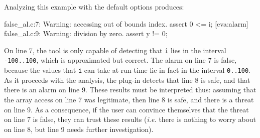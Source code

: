 \documentclass{frama-c-book}
\begin{document}
Analyzing this example with the default options produces:
\begin{logsmath}
 false_al.c:7: Warning: accessing out of bounds index. assert 0 <= i;
[eva:alarm] false_al.c:9: Warning: division by zero. assert y != 0;
\end{logsmath}

On line 7, the tool is only capable of detecting that \lstinline|i| lies in
the interval \lstinline|-100..100|, which is approximated but correct.
The alarm on line 7 is false, because the values that \lstinline|i| can
take at run-time lie in fact in the interval \lstinline|0..100|. As it
proceeds with the analysis, the plug-in detects that line 8 is safe, and
that there is an alarm on line 9. These results must be interpreted
thus: assuming that the array access on line 7 was legitimate, then
line 8 is safe, and there is a threat on line 9. As a consequence, if
the user can convince themselves that the threat on line 7 is false,
they can trust these results ({\it i.e.} there is nothing to worry
about on line 8, but line 9 needs further investigation).




\end{document}
